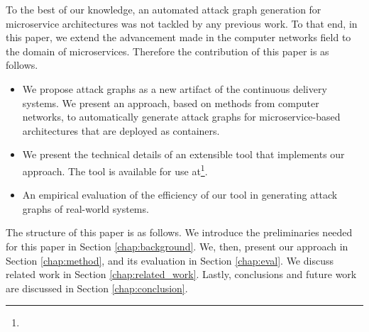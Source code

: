 To the best of our knowledge, an automated attack graph generation for microservice architectures was not tackled by any previous work. To that end, in this paper, we extend the advancement made in the computer networks field to the domain of microservices. Therefore the contribution of this paper is as follows.
\begin{itemize}
	\item We propose attack graphs as a new artifact of the continuous delivery systems. We present an approach, based on methods from computer networks, to automatically generate attack graphs for microservice-based architectures that are deployed as containers.   
	\item We present the technical details of an extensible tool that implements our approach. The tool is available for use at\footnote{}.
	\item An empirical evaluation of the efficiency of our tool in generating attack graphs of real-world systems.
\end{itemize}










The structure of this paper is as follows. We introduce the preliminaries needed for this paper in Section \ref{chap:background}. We, then, present our approach in Section \ref{chap:method}, and its evaluation in Section \ref{chap:eval}. We discuss related work in Section \ref{chap:related_work}. Lastly, conclusions and future work are discussed in Section \ref{chap:conclusion}.

